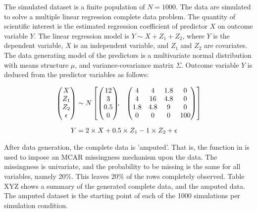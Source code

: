 \documentclass[article]{jss}
\newcommand{\fct}[1]{\code{#1()}}
\begin{document}
The simulated dataset is a finite population of $N=1000$. The data are simulated to solve a multiple linear regression complete data problem. The quantity of scientific interest is the estimated regression coefficient of predictor $X$ on outcome variable $Y$. The linear regression model is $Y \sim X+Z_1+Z_2$, where $Y$ is the dependent variable, $X$ is an independent variable, and $Z_1$ and $Z_2$ are covariates. The data generating model of the predictors is a multivariate normal distribution with means structure $\mu$, and variance-covariance matrix $\Sigma$. Outcome variable $Y$ is deduced from the predictor variables as follows:

\begin{align*}
\begin{pmatrix}X\\
Z_{1}\\
Z_{2}\\
\epsilon
\end{pmatrix} &\sim  N
\begin{bmatrix}
\begin{pmatrix}
12\\
3\\
0.5\\
0
\end{pmatrix}\!\!,&
\begin{pmatrix}
4 & 4 & 1.8 & 0\\
4 & 16 & 4.8 & 0\\
1.8 & 4.8 & 9 & 0\\
0 & 0 & 0 & 100
\end{pmatrix}
\end{bmatrix}\\[2\jot]
Y &=  2 \times X + 0.5 \times Z_1 - 1 \times Z_2 + \epsilon
\end{align*}

After data generation, the complete data is 'amputed'. That is, the  function \fct{ampute} in  is used to impose an MCAR missingness mechanism upon the data. The missingness is univariate, and the probability to be missing is the same for all variables, namely 20\%. This leaves 20\% of the rows completely observed. %
Table XYZ shows a summary of the generated complete data, and the amputed data. The amputed dataset is the starting point of each of the 1000 simulations per simulation condition.
\end{document}

